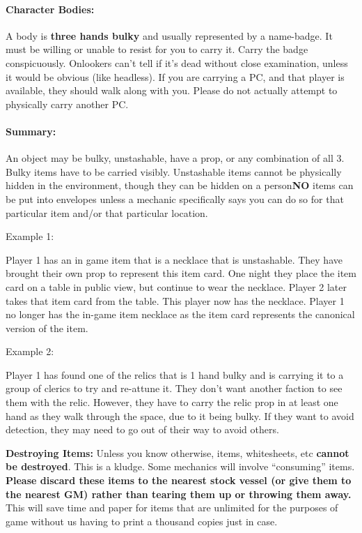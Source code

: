 \documentclass[sheet]{GL2020}
\begin{document}
\paragraph{Character Bodies:} A body is {\bf three hands bulky} and usually represented by a name-badge.  It must be willing or unable to resist for you to carry it.  Carry the badge conspicuously. Onlookers can't tell if it's dead without close examination, unless it would be obvious (like headless). If you are carrying a PC, and that player is available, they should walk along with you. Please do not actually attempt to physically carry another PC.

\paragraph{Summary:} An object may be bulky, unstashable, have a prop, or any combination of all 3. Bulky items have to be carried visibly. Unstashable items cannot be physically hidden in the environment, though they can be hidden on a person\textbf{NO} items can be put into envelopes unless a mechanic specifically says you can do so for that particular item and/or that particular location.

Example 1:

Player 1 has an in game item that is a necklace that is unstashable. They have brought their own prop to represent this item card. One night they place the item card on a table in public view, but continue to wear the necklace. Player 2 later takes that item card from the table. This player now has the necklace. Player 1 no longer has the in-game item necklace as the item card represents the canonical version of the item.

Example 2:

Player 1 has found one of the relics that is 1 hand bulky and is carrying it to a group of clerics to try and re-attune it. They don’t want another faction to see them with the relic. However, they have to carry the relic prop in at least one hand as they walk through the space, due to it being bulky. If they want to avoid detection, they may need to go out of their way to avoid others.

\textbf{Destroying Items:} Unless you know otherwise, items, whitesheets, etc \textbf{cannot be destroyed}. This is a kludge. Some mechanics will involve ``consuming'' items. \textbf{Please discard these items to the nearest stock vessel (or give them to the nearest GM) rather than tearing them up or throwing them away.} This will save time and paper for items that are unlimited for the purposes of game without us having to print a thousand copies just in case.
\end{document}
